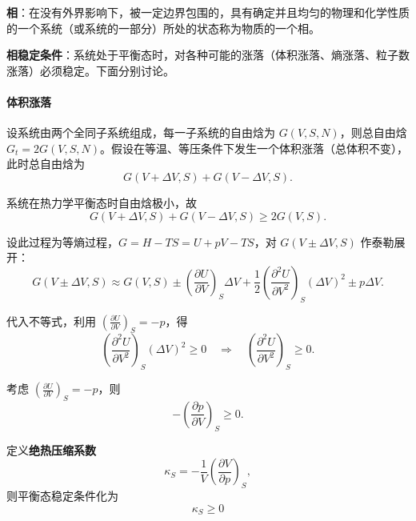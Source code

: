 \documentclass[UTF8]{ctexart}
\theoremstyle{definition}
\begin{document}
\textbf{相}：在没有外界影响下，被一定边界包围的，具有确定并且均匀的物理和化学性质的一个系统（或系统的一部分）所处的状态称为物质的一个相。

\textbf{相稳定条件}：系统处于平衡态时，对各种可能的涨落（体积涨落、熵涨落、粒子数涨落）必须稳定。下面分别讨论。

\paragraph{体积涨落}

设系统由两个全同子系统组成，每一子系统的自由焓为 $G(V,S,N)$，则总自由焓 $G_t=2G(V,S,N)$。假设在等温、等压条件下发生一个体积涨落（总体积不变），此时总自由焓为
\begin{equation}
G(V+\Delta V,S) + G(V-\Delta V,S).
\end{equation}

系统在热力学平衡态时自由焓极小，故
\begin{equation}
G(V+\Delta V,S) + G(V-\Delta V,S) \ge 2G(V,S).
\end{equation}

设此过程为等熵过程，$G=H-TS=U+pV-TS$，对 $G(V\pm\Delta V,S)$ 作泰勒展开：
\begin{equation}
G(V\pm\Delta V,S) \approx G(V,S) \pm \left(\frac{\partial U}{\partial V}\right)_S\Delta V
+ \frac{1}{2}\left(\frac{\partial^2 U}{\partial V^2}\right)_S(\Delta V)^2 \pm p\Delta V.
\end{equation}

代入不等式，利用 $\displaystyle\left(\frac{\partial U}{\partial V}\right)_S=-p$，得
\begin{equation}
\left(\frac{\partial^2 U}{\partial V^2}\right)_S(\Delta V)^2 \ge 0
\quad\Rightarrow\quad
\left(\frac{\partial^2 U}{\partial V^2}\right)_S \ge 0.
\end{equation}

考虑 $\displaystyle\left(\frac{\partial U}{\partial V}\right)_S=-p$，则
\begin{equation}
-\left(\frac{\partial p}{\partial V}\right)_S \ge 0.
\end{equation}

定义\textbf{绝热压缩系数}
\begin{equation}
\kappa_S = -\frac{1}{V}\left(\frac{\partial V}{\partial p}\right)_S,
\end{equation}
则平衡态稳定条件化为
\begin{equation}
\boxed{\kappa_S \ge 0}
\end{equation}
\end{document}
